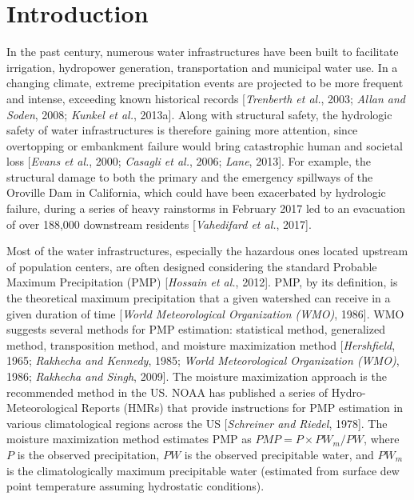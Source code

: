 \vspace{20mm}

\section{Introduction}

In the past century, numerous water infrastructures have been built to facilitate irrigation, hydropower generation, transportation and municipal water use. In a changing climate, extreme precipitation events are projected to be more frequent and intense, exceeding known historical records [\textit{Trenberth et al.}, 2003; \textit{Allan and Soden}, 2008; \textit{Kunkel et al.}, 2013a]. Along with structural safety, the hydrologic safety of water infrastructures is therefore gaining more attention, since overtopping or embankment failure would bring catastrophic human and societal loss [\textit{Evans et al.}, 2000; \textit{Casagli et al.}, 2006; \textit{Lane}, 2013]. For example, the structural damage to both the primary and the emergency spillways of the Oroville Dam in California, which could have been exacerbated by hydrologic failure, during a series of heavy rainstorms in February 2017 led to an evacuation of over 188,000 downstream residents [\textit{Vahedifard et al.}, 2017].

Most of the water infrastructures, especially the hazardous ones located upstream of population centers, are often designed considering the standard Probable Maximum Precipitation (PMP) [\textit{Hossain et al.}, 2012]. PMP, by its definition, is the theoretical maximum precipitation that a given watershed can receive in a given duration of time [\textit{World Meteorological Organization (WMO)}, 1986]. WMO suggests several methods for PMP estimation: statistical method, generalized method, transposition method, and moisture maximization method [\textit{Hershfield}, 1965; \textit{Rakhecha and Kennedy}, 1985; \textit{World Meteorological Organization (WMO)}, 1986; \textit{Rakhecha and Singh}, 2009]. The moisture maximization approach is the recommended method in the US. NOAA has published a series of Hydro-Meteorological Reports (HMRs) that provide instructions for PMP estimation in various climatological regions across the US [\textit{Schreiner and Riedel}, 1978]. The moisture maximization method estimates PMP as $PMP=P\times{PW_m}/PW$, where $P$ is the observed precipitation, $PW$ is the observed precipitable water, and $PW_m$ is the climatologically maximum precipitable water (estimated from surface dew point temperature assuming hydrostatic conditions).

